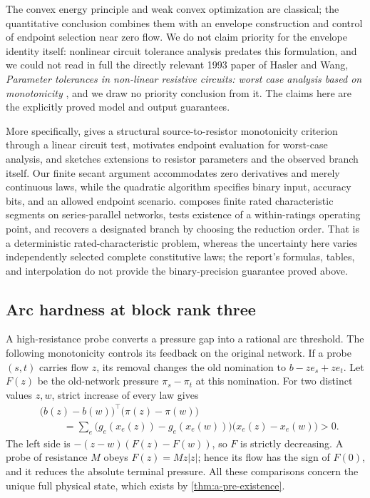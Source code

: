 The convex energy principle and weak convex optimization are classical;
the quantitative conclusion combines them with an envelope construction
and control of endpoint selection near zero flow. We do not claim
priority for the envelope identity itself: nonlinear circuit tolerance
analysis predates this formulation, and we could not read in full the
directly relevant 1993 paper of Hasler and Wang, \emph{Parameter tolerances in non-linear resistive
circuits: worst case analysis based on monotonicity}
\citep{hasler1993-parameter-tolerances}, and we draw no priority
conclusion from it. The claims here are the
explicitly proved model and output guarantees.

More specifically, \citet[Theorem 3]{chauffoureaux1990-monotonicity}
gives a structural source-to-resistor monotonicity criterion through a
linear circuit test, motivates endpoint evaluation for worst-case
analysis, and sketches extensions to resistor parameters and the
observed branch itself. Our finite secant argument accommodates zero
derivatives and merely continuous laws, while the quadratic algorithm
specifies binary input, accuracy bits, and an allowed endpoint scenario.
\citet[Sections 4--5 and 8--9 of the report version]{zemanian1999-ratings}
composes finite rated characteristic segments on series-parallel
networks, tests existence of a within-ratings operating point, and
recovers a designated branch by choosing the reduction order. That is
a deterministic rated-characteristic problem, whereas the uncertainty
here varies independently selected complete constitutive laws; the
report's formulas, tables, and interpolation do not provide the
binary-precision guarantee proved above.

\subsection{Arc hardness at block rank three}
\label{subsec:a-bound-arc-hardness}

A high-resistance probe converts a pressure gap into a rational arc
threshold. The following monotonicity controls its feedback on the
original network. If a probe $(s,t)$ carries flow $z$, its
removal changes the old nomination to $b-z e_s+z e_t$. Let $F(z)$ be
the old-network pressure $\pi_s-\pi_t$ at this nomination. For two
distinct values $z,w$, strict increase of every law gives
\begin{align*}
 &\bigl(b(z)-b(w)\bigr)^\top\bigl(\pi(z)-\pi(w)\bigr)\\
 &\hspace{1cm}=\sum_e\bigl(g_e(x_e(z))-g_e(x_e(w))\bigr)
                         \bigl(x_e(z)-x_e(w)\bigr)>0.
\end{align*}
The left side is $-(z-w)(F(z)-F(w))$, so $F$ is strictly decreasing.
A probe of resistance $M$ obeys $F(z)=Mz|z|$; hence its flow has the
sign of $F(0)$, and it reduces the absolute terminal pressure. All these
comparisons concern the unique full physical state, which exists by
\cref{thm:a-pre-existence}.

